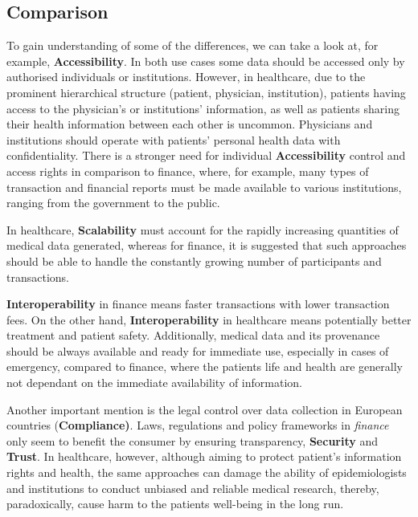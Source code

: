 
\subsection{Comparison}
\label{ssec:comparison}

To gain understanding of some of the differences, we can take a look at, for example, \textbf{Accessibility}. In both use cases some data should be accessed only by authorised individuals or institutions. However, in healthcare, due to the prominent hierarchical structure (patient, physician, institution), patients having access to the physician's or institutions' information, as well as patients sharing their health information between each other is uncommon. Physicians and institutions should operate with patients' personal health data with confidentiality. There is a stronger need for individual \textbf{Accessibility} control and access rights in comparison to finance, where, for example, many types of transaction and financial reports must be made available to various institutions, ranging from the government to the public. 

In healthcare, \textbf{Scalability} must account for the rapidly increasing quantities of medical data generated, whereas for finance, it is suggested that such approaches should be able to handle the constantly growing number of participants and transactions.

\textbf{Interoperability} in finance means faster transactions with lower transaction fees. On the other hand, \textbf{Interoperability} in healthcare means potentially better treatment and patient safety. Additionally, medical data and its provenance should be always available and ready for immediate use, especially in cases of emergency, compared to finance, where the patients life and health are generally not dependant on the immediate availability of information.

Another important mention is the legal control over data collection in European countries (\textbf{Compliance)}. Laws, regulations and policy frameworks in \textit{finance} only seem to benefit the consumer by ensuring transparency, \textbf{Security} and \textbf{Trust}. In healthcare, however, although aiming to protect patient's information rights and health, the same approaches can damage the ability of epidemiologists and institutions to conduct unbiased and reliable medical research, thereby, paradoxically, cause harm to the patients well-being in the long run.

